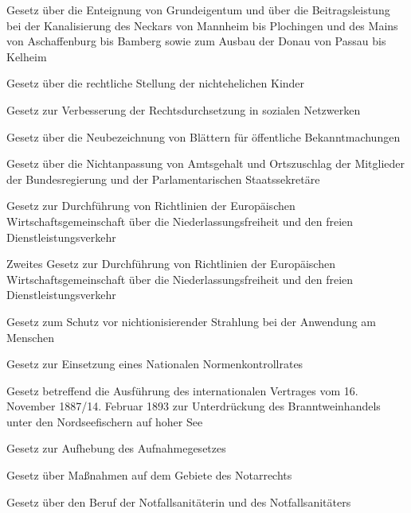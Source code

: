 \item[{Neckar-MainG}] Gesetz über die Enteignung von Grundeigentum und über die Beitragsleistung bei der Kanalisierung des Neckars von Mannheim bis Plochingen und des Mains von Aschaffenburg bis Bamberg sowie zum Ausbau der Donau von Passau bis Kelheim

\item[{NEhelG}] Gesetz über die rechtliche Stellung der nichtehelichen Kinder

\item[{NetzDG}] Gesetz zur Verbesserung der Rechtsdurchsetzung in sozialen Netzwerken

\item[{NeuBezG}] Gesetz über die Neubezeichnung von Blättern für öffentliche Bekanntmachungen

\item[{NichtAnpG}] Gesetz über die Nichtanpassung von Amtsgehalt und Ortszuschlag der Mitglieder der Bundesregierung und der Parlamentarischen Staatssekretäre

\item[{NiederlFrhEWGDG-1}] Gesetz zur Durchführung von Richtlinien der Europäischen Wirtschaftsgemeinschaft über die Niederlassungsfreiheit und den freien Dienstleistungsverkehr

\item[{NiederlFrhEWGDG-2}] Zweites Gesetz zur Durchführung von Richtlinien der Europäischen Wirtschaftsgemeinschaft über die Niederlassungsfreiheit und den freien Dienstleistungsverkehr

\item[{NiSG}] Gesetz zum Schutz vor nichtionisierender Strahlung bei der Anwendung am Menschen

\item[{NKRG}] Gesetz zur Einsetzung eines Nationalen Normenkontrollrates

\item[{NordSBrWeinG}] Gesetz betreffend die Ausführung des internationalen Vertrages vom 16. November 1887/14. Februar 1893 zur Unterdrückung des Branntweinhandels unter den Nordseefischern auf hoher See

\item[{NotAufnGAufhG}] Gesetz zur Aufhebung des Aufnahmegesetzes

\item[{NotRMaßnG}] Gesetz über Maßnahmen auf dem Gebiete des Notarrechts

\item[{NotSanG}] Gesetz über den Beruf der Notfallsanitäterin und des Notfallsanitäters

